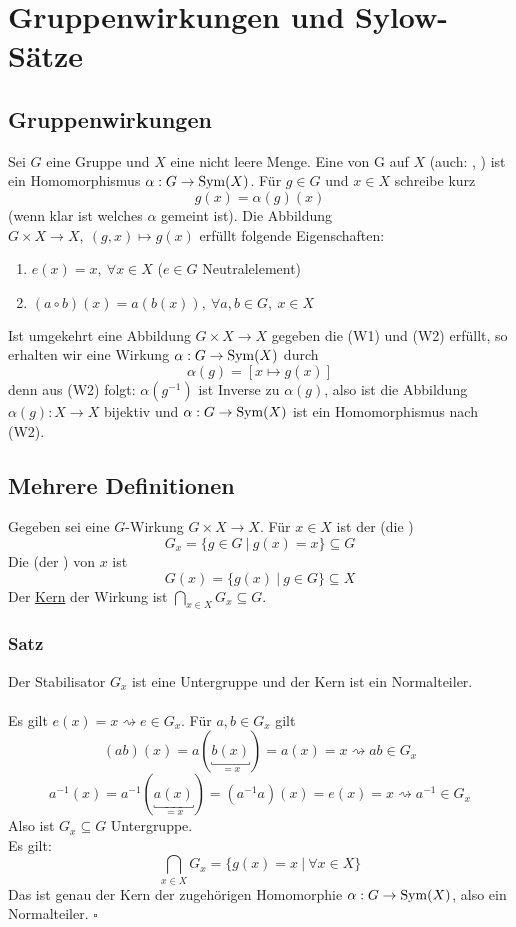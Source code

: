 \newpage

\section{Gruppenwirkungen und Sylow-Sätze}
\label{sec:gruppen_sylow}

\subsection{Gruppenwirkungen}
\label{sub:gruppenwirkungen}
Sei $G$ eine Gruppe und $X$ eine nicht leere Menge. 
Eine  von G auf $X$ (auch: , ) ist ein Homomorphismus $\alpha:G\to \operatorname{Sym}(X)$. 
Für $g\in G$ und $x\in X$ schreibe kurz 
\[
g(x)=\alpha(g)(x) 
\] 
(wenn klar ist welches $\alpha$ gemeint ist). 
Die Abbildung $G\times X\to X,~ (g,x)\mapsto g(x)$ erfüllt folgende Eigenschaften:
\begin{enumerate}[(W1)]
	\item $e(x)=x,~\forall x\in X$ ($e\in G$ Neutralelement)
	\item $(a\circ b)(x)=a(b(x)),~\forall a,b\in G,~x\in X$
\end{enumerate}
Ist umgekehrt eine Abbildung $G\times X\to X$ gegeben die (W1) und (W2) erfüllt, so erhalten wir eine Wirkung $\alpha: G\to \operatorname{Sym}(X)$ durch
\[
\alpha(g)=[x\mapsto g(x)] 
\]
denn aus (W2) folgt: 
$\alpha(g^{-1})$ ist Inverse zu $\alpha(g)$, also ist die Abbildung $\alpha(g):X\to X$ bijektiv und $\alpha:G\to \operatorname{Sym}(X)$ ist ein Homomorphismus nach (W2).

\subsection{Mehrere Definitionen}
\label{sub:mehrere_def}
Gegeben sei eine $G$-Wirkung $G\times X\to X$. 
Für $x\in X$ ist der  (die )
\[
G_x=\{g\in G~|~g(x)=x \}\subseteq G 
\]
Die  (der ) von $x$ ist 
\[
G(x)=\{g(x)~|~g\in G \}\subseteq X 
\]
Der \uline{Kern} der Wirkung ist $\bigcap\limits_{x\in X}G_x\subseteq G$.

\subsubsection*{Satz}
Der Stabilisator $G_x$ ist eine Untergruppe und der Kern ist ein Normalteiler.\\

\\
Es gilt $e(x)=x \rightsquigarrow e\in G_x$. 
Für $a,b\in G_x$ gilt 
\[
(ab)(x)=a(\underbracket{b(x)}_{=x})=a(x)=x \rightsquigarrow ab\in G_x
\]
\[
a^{-1}(x)=a^{-1}(\underbracket{a(x)}_{=x})=(a^{-1}a)(x)=e(x)=x \rightsquigarrow a^{-1}\in G_x 
\]
Also ist $G_x\subseteq G$ Untergruppe.\\
Es gilt: 
\[
\bigcap\limits_{x\in X}G_x=\{g(x)=x~|~\forall x\in X \} 
\]
Das ist genau der Kern der zugehörigen Homomorphie $\alpha:G\to \operatorname{Sym}(X)$, also ein Normalteiler.
\hfill $\square$

